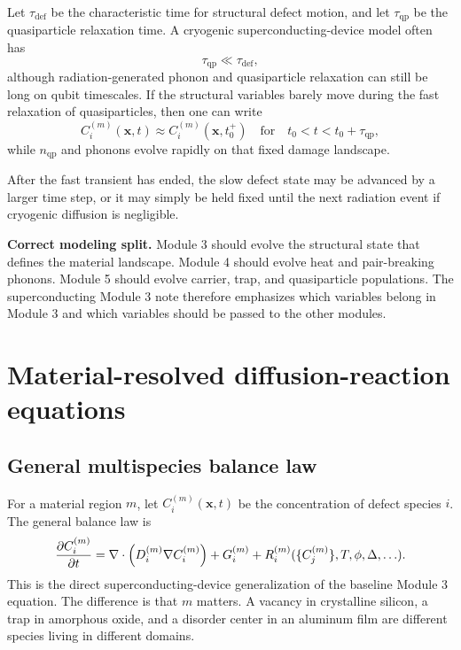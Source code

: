 \documentclass[11pt]{article}
\newcommand{\x}{\mathbf{x}}
\begin{document}
Let $\tau_{\mathrm{def}}$ be the characteristic time for structural defect motion, and let $\tau_{\mathrm{qp}}$ be the quasiparticle relaxation time. A cryogenic superconducting-device model often has
\begin{equation}
\tau_{\mathrm{qp}} \ll \tau_{\mathrm{def}},
\end{equation}
although radiation-generated phonon and quasiparticle relaxation can still be long on qubit timescales. If the structural variables barely move during the fast relaxation of quasiparticles, then one can write
\begin{equation}
C_i^{(m)}(\x,t) \approx C_i^{(m)}(\x,t_0^+) \quad \text{for} \quad t_0<t<t_0+\tau_{\mathrm{qp}},
\label{eq:frozen_structural_during_qp}
\end{equation}
while $n_{\mathrm{qp}}$ and phonons evolve rapidly on that fixed damage landscape.

After the fast transient has ended, the slow defect state may be advanced by a larger time step, or it may simply be held fixed until the next radiation event if cryogenic diffusion is negligible.

\begin{physicsbox}
\textbf{Correct modeling split.} Module 3 should evolve the structural state that defines the material landscape. Module 4 should evolve heat and pair-breaking phonons. Module 5 should evolve carrier, trap, and quasiparticle populations. The superconducting Module 3 note therefore emphasizes which variables belong in Module 3 and which variables should be passed to the other modules.
\end{physicsbox}

\section{Material-resolved diffusion-reaction equations}

\subsection{General multispecies balance law}

For a material region $m$, let $C_i^{(m)}(\x,t)$ be the concentration of defect species $i$. The general balance law is
\begin{equation}
\pdv{C_i^{(m)}}{t}
=\nabla\cdot\left(D_i^{(m)}\nabla C_i^{(m)}\right)
+G_i^{(m)}
+R_i^{(m)}(\{C_j^{(m)}\},T,\phi,\Delta,\ldots).
\label{eq:material_rd}
\end{equation}
This is the direct superconducting-device generalization of the baseline Module 3 equation. The difference is that $m$ matters. A vacancy in crystalline silicon, a trap in amorphous oxide, and a disorder center in an aluminum film are different species living in different domains.
\end{document}
